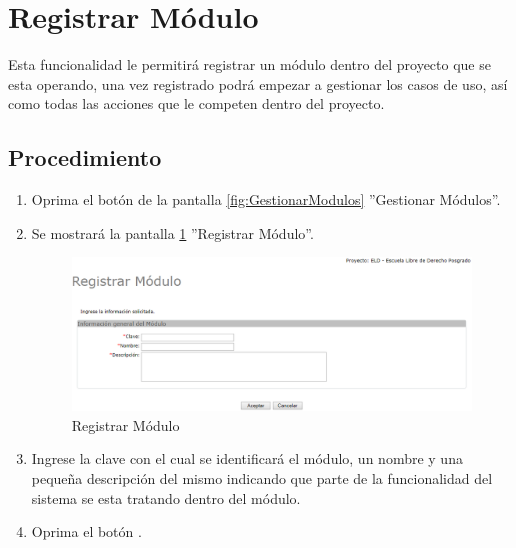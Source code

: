 
\hypertarget{cv:registrarModulo}{\section{Registrar Módulo}} \label{sec:registrarModulo}

	Esta funcionalidad le permitirá registrar un módulo dentro del proyecto que se esta operando, una vez registrado podrá empezar a gestionar los casos de uso, así como todas las acciones que le competen dentro del proyecto. 

		\subsection{Procedimiento}

			\begin{enumerate}
	
			\item Oprima el botón \IURegistrar{} de la pantalla \ref{fig:GestionarModulos} ''Gestionar Módulos''.
			
			\item Se mostrará la pantalla \ref{fig:registrarModulo} ''Registrar Módulo''.

			\begin{figure}[htbp!]
				\begin{center}
					\includegraphics[scale=0.6]{roles/lider/modulos/pantallas/IU5-1registrarModulo}
					\caption{Registrar Módulo}
					\label{fig:registrarModulo}
				\end{center}
			\end{figure}
		
			\item Ingrese la clave con el cual se identificará el módulo, un nombre y una pequeña descripción del mismo indicando que parte de la funcionalidad del sistema se esta tratando dentro del módulo.
			
			\item Oprima el botón \IUAceptar.
			

\end{enumerate}
